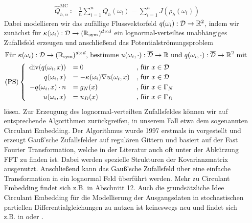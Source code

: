 \begin{align}
	\label{MC-Schätzer}
	\widehat{Q}_{h,n}^{\text{MC}} \coloneqq \frac{1}{n} \sum_{i=1}^{n} Q_h(\omega_i) = \sum_{i=1}^{n} J(\rho_h(\omega_i))
\end{align}
Dabei modellieren wir das zufällige Flussvektorfeld $ q(\omega_i)  : \mathcal{D} \to \mathbb{R}^2 $, indem wir zunächst für $ \kappa(\omega_i) : \mathcal{D} \rightarrow (\mathbb{R}_{\text{sym}})^{d \times d} $ ein lognormal-verteiltes unabhängiges Zufallsfeld erzeugen und anschließend das Potentialströmungsproblem
\begin{align*}
\setlength\arraycolsep{1pt}
&\text{Für } \kappa(\omega_i) : \mathcal{D} \rightarrow (\R_{\text{sym}})^{d \times d} \text{, bestimme } u(\omega_i,\cdot):\overline{\mathcal{D}} \to \R \text{ und } q(\omega_i, \cdot): \overline{\mathcal{D}} \to \R^2 \text{ mit } \\
&\text{(PS)}
\begin{cases}
\begin{array}{rlll}
\dive (q(\omega_i,x)) &= 0  &\text{, für } x \in \mathcal{ D}\\  
q(\omega_i,x) &= - \kappa(\omega_i) \nabla u(\omega_i,x)  &\text{, für } x \in \mathcal{D}\\
-q(\omega_i,x) \cdot n &= g_N(x)  &\text{, für } x \in \Gamma_N \\
u(\omega_i,x) &= u_D(x)  &\text{, für } x \in \Gamma_D \\
\end{array}
\end{cases} \\
\end{align*}
lösen. Zur Erzeugung des lognormal-verteilten Zufallsfeldes können wir auf entsprechende Algorithmen zurückgreifen, in unserem Fall etwa dem sogenannten Circulant Embedding.
Der Algorithmus wurde 1997 erstmals in \cite{dietrich1997fast} vorgestellt und 
erzeugt Gauß'sche Zufallsfelder auf regulären Gittern und basiert auf der Fast Fourier Transformation, welche in der Literatur auch oft unter der Abkürzung FFT zu finden ist.
Dabei werden spezielle Strukturen der Kovarianzmatrix ausgenutzt. Anschließend kann das Gauß'sche Zufallsfeld über eine einfache Transformation in ein lognormal Feld überführt werden. Mehr zu Circulant Embedding findet sich z.B. in \cite{schmidt2014stochastic} Abschnitt 12.
Auch die grundsätzliche Idee Circulant Embedding für die Modellierung der Ausgangsdaten in stochastischen partiellen Differentialgleichungen zu nutzen ist keineswegs neu und findet sich z.B. in \cite{charrier2012strong} oder \cite{cliffe2011multilevel}.
